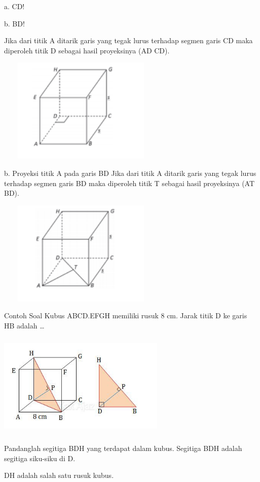 \documentclass[11pt,fleqn]{book} %
\begin{document}
a. CD!

b. BD!

Jika dari titik A ditarik garis yang tegak lurus terhadap
segmen garis CD maka diperoleh titik D sebagai hasil
proyeksinya (AD CD). 

\includegraphics[width = 8cm, height= 5cm]{Pictures/gi6.png}

b. Proyeksi titik A pada garis BD
Jika dari titik A ditarik garis yang tegak lurus
terhadap segmen garis BD maka diperoleh titik T
sebagai hasil proyeksinya (AT  BD).

\includegraphics[width = 8cm, height= 5cm]{Pictures/gi7.png}

Contoh Soal
Kubus ABCD.EFGH memiliki rusuk 8 cm. Jarak titik D ke garis HB adalah …

\includegraphics[width = 8cm, height= 5cm]{Pictures/gi8.png}

Pandanglah segitiga BDH yang terdapat dalam kubus. Segitiga BDH adalah segitiga siku-siku di D.

DH adalah salah satu rusuk kubus.
\end{document}

